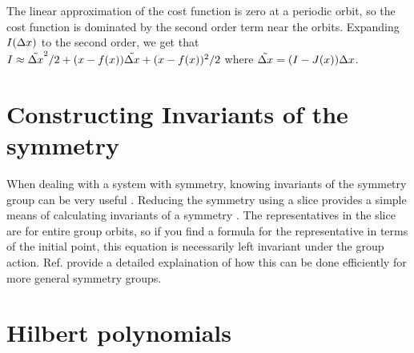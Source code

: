 {The linear approximation of the cost function is zero at a
periodic orbit, so the cost function is dominated by the
second order term near the orbits. Expanding $I(\Delta x)$
to the second order, we get that $I \approx \tilde{\Delta
x}^2/2 + (x - f(x)) \tilde{\Delta x} +
(x-f(x))^2/2$ where $\tilde{\Delta x} =
(I-J(x))\Delta x$.
    \fi %

\section{Constructing Invariants of the symmetry}

When dealing with a system with symmetry, knowing invariants of the symmetry group can be very useful . Reducing the symmetry using a slice provides a simple means of calculating invariants of a symmetry . The representatives in the slice are for entire group orbits, so if you find a formula for the representative in terms of the initial point, this equation is necessarily left invariant under the group action.
Ref.  provide a detailed explaination of how this can be done efficiently for more general symmetry groups.



	\ifarticle
	\else

\section{Hilbert polynomials}
\label{SF:relStab}

}
